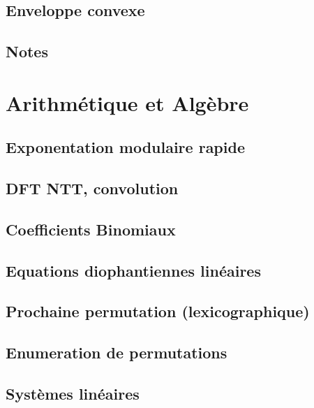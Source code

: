 \documentclass[10pt]{article}
\begin{document}
\subsection{Enveloppe convexe}
{\scriptsize}

\subsection{Notes}



\section{Arithmétique et Algèbre}
\subsection{Exponentation modulaire rapide}
{\scriptsize}

\subsection{DFT NTT, convolution}
{\scriptsize}

\subsection{Coefficients Binomiaux}
{\scriptsize}

\subsection{Equations diophantiennes linéaires}
{\scriptsize}

\subsection{Prochaine permutation (lexicographique)}
{\scriptsize}

\subsection{Enumeration de permutations}
{\scriptsize}

\subsection{Systèmes linéaires}
{\scriptsize}
\end{document}
